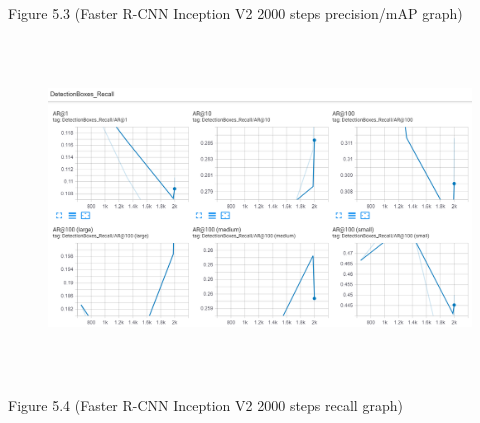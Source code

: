 \documentclass[12pt]{report}
\renewcommand{\_}{\kern-1.5pt\textunderscore\kern-1.5pt}
\begin{document}

\par

\begin{FlushRight}
Figure 5.3 (Faster R-CNN Inception V2 2000 steps precision/mAP graph)
\end{FlushRight}\par




\begin{figure}[H]
	\begin{Center}
		\includegraphics[width=6.27in,height=3.54in]{./media/image2.png}
	\end{Center}
\end{figure}



\par

\begin{FlushRight}
Figure 5.4 (Faster R-CNN Inception V2 2000 steps recall graph)
\end{FlushRight}\par


\vspace{\baselineskip}

\vspace{\baselineskip}

\vspace{\baselineskip}

\vspace{\baselineskip}
\end{document}
